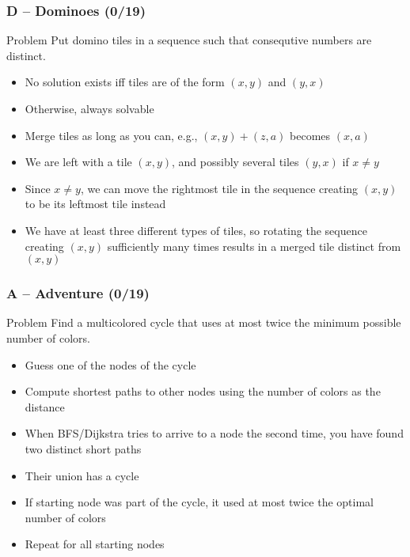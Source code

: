 \documentclass{beamer}
\begin{document}
\begin{frame}
\frametitle{D -- Dominoes (0/19)}
    \begin{block}{Problem}
        Put domino tiles in a sequence such that consequtive numbers are distinct.
    \end{block}
    \begin{itemize}
        \item No solution exists iff tiles are of the form $(x, y)$ and $(y, x)$
        \item Otherwise, always solvable
        \item Merge tiles as long as you can, e.g., $(x, y) + (z, a)$ becomes $(x, a)$
        \item We are left with a tile $(x, y)$, and possibly several tiles $(y, x)$ if $x \neq y$
        \item Since $x \neq y$, we can move the rightmost tile in the sequence creating $(x, y)$ to be its leftmost tile instead
        \item We have at least three different types of tiles, so rotating the sequence creating $(x, y)$ sufficiently many times results in a merged tile distinct from $(x, y)$
    \end{itemize}
\end{frame}

\begin{frame}
\frametitle{A -- Adventure (0/19)}
    \begin{block}{Problem}
    Find a multicolored cycle that uses at most twice the minimum possible number of colors. 
    \end{block}
    \begin{itemize}
        \item Guess one of the nodes of the cycle
        \item Compute shortest paths to other nodes using the number of colors as the distance
        \item When BFS/Dijkstra tries to arrive to a node the second time, you have found two distinct short paths
        \item Their union has a cycle
        \item If starting node was part of the cycle, it used at most twice the optimal number of colors
        \item Repeat for all starting nodes
    \end{itemize}
\end{frame}
\end{document}
